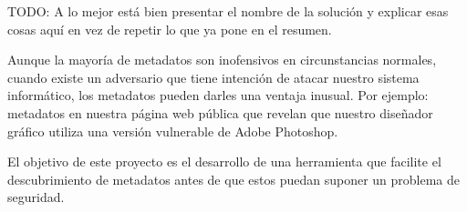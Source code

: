 TODO: A lo mejor está bien presentar el nombre de la solución y explicar esas cosas aquí en vez de repetir lo que ya pone en el resumen.

Aunque la mayoría de metadatos son inofensivos en circunstancias normales, cuando existe un adversario que tiene intención de atacar nuestro sistema informático, los metadatos pueden darles una ventaja inusual. Por ejemplo: metadatos en nuestra página web pública que revelan que nuestro diseñador gráfico utiliza una versión vulnerable de Adobe Photoshop.

El objetivo de este proyecto es el desarrollo de una herramienta que facilite el descubrimiento de metadatos antes de que estos puedan suponer un problema de seguridad.
